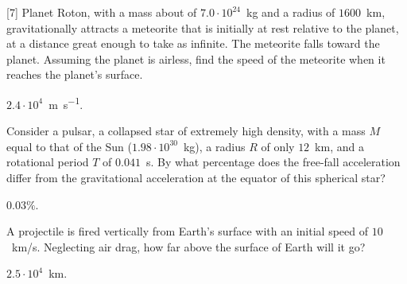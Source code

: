 \begin{problem}
	Planet Roton, with a mass about of $7.0 \cdot 10^{24}$~kg and a radius of $1600$~km, gravitationally attracts a meteorite that is initially at rest relative to the planet, at a distance great enough to take as infinite. The meteorite falls toward the planet. Assuming the planet is airless, find the speed of the meteorite when it reaches the planet's surface.
	\begin{solution}
		$2.4 \cdot 10^4$~\si{\meter\per\second}.
	\end{solution}
\end{problem}

\begin{problem}
	Consider a pulsar, a collapsed star of extremely high density, with a mass $M$ equal to that of the Sun ($1.98 \cdot 10^{30}$~kg), a radius $R$ of only $12$~km, and a rotational period $T$ of $0.041$~s. By what percentage does the free-fall acceleration differ from the gravitational acceleration at the equator of this spherical star?
	\begin{solution}
		$0.03\%$.
	\end{solution}
\end{problem}


\begin{problem}
	A projectile is fired vertically from Earth’s surface with an initial speed of $10$~km/s. Neglecting air drag, how far above the surface of Earth will it go?
	\begin{solution}
		$2.5 \cdot 10^4$~\si{\kilo\meter}.
	\end{solution}
\end{problem}


